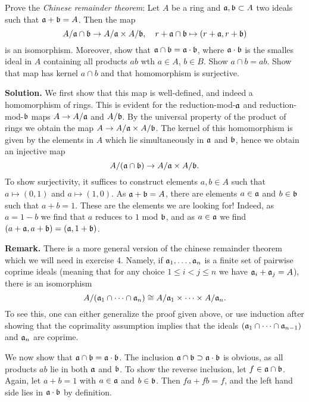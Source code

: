 \documentclass[a4paper,11pt]{article}
\begin{document}
Prove the \textit{Chinese remainder theorem}: Let $A$ be a ring and $\mathfrak{a}, \mathfrak{b}
\subset A$ two ideals such that $\mathfrak{a} + \mathfrak{b} = A$. Then the map 
\begin{equation*}
    A/ \mathfrak{a} \cap \mathfrak{b} \to A/ \mathfrak{a} \times A/\mathfrak{b}, \quad 
    r + \mathfrak{a} \cap \mathfrak{b} \mapsto (r + \mathfrak{a}, r + \mathfrak{b})
\end{equation*}
is an isomorphism. Moreover, show that $\mathfrak{a} \cap \mathfrak{b} = \mathfrak{a} \cdot \mathfrak{b}$, where
$\mathfrak{a} \cdot \mathfrak{b}$ is the smalles ideal in $A$ containing all products $ab$ 
wth $a \in A$, $b \in B$. 
Show $a \cap b = ab$. Show that map has kernel $a \cap b$ and that homomorphism is surjective. 

\textbf{Solution.} We first show that this map is well-defined, and indeed a 
homomorphism of rings. This is evident for the reduction-mod-$\mathfrak{a}$ and 
reduction-mod-$\mathfrak{b}$ maps $A \to A/\mathfrak{a}$ and $A/\mathfrak{b}$. By the universal property of 
the product of rings we obtain the map $A \to A/\mathfrak{a} \times A/\mathfrak{b}$. The kernel
of this homomorphism is given by the elements in $A$ which lie simultaneously in 
$\mathfrak{a}$ and $\mathfrak{b}$, hence we obtain an injective map 
\begin{equation*}
    A/(\mathfrak{a} \cap \mathfrak{b}) \to A/\mathfrak{a} \times A/\mathfrak{b}.
\end{equation*}
To show surjectivity, it suffices to construct elements $a, b \in A$ such that 
$a \mapsto (0,1)$ and $a \mapsto (1,0)$. As $\mathfrak{a} + \mathfrak{b} = A$, there are elements
$a \in \mathfrak{a}$ and $b \in \mathfrak{b}$ such that $a + b = 1$. These are the elements we 
are looking for! Indeed, as $a = 1 - b$ we find that $a$ reduces to $1$ mod $\mathfrak{b}$,
and as $a \in \mathfrak{a}$ we find $(a + \mathfrak{a}, a + \mathfrak{b}) = (\mathfrak{a}, 1 + \mathfrak{b})$. 

\textbf{Remark.} There is a more general version of the chinese remainder theorem
which we will need in exercise 4. Namely, if $\mathfrak{a}_1, \dots, \mathfrak{a}_n$ is a finite
set of pairwise coprime ideals (meaning that for any choice $1 \leq i < j \leq n$
we have $\mathfrak{a}_i + \mathfrak{a}_j = A$), there is an isomorphism
\begin{equation*}
    A/(\mathfrak{a}_1 \cap \dots \cap \mathfrak{a}_n) \cong A/\mathfrak{a}_1 \times \dots \times A/\mathfrak{a}_n.
\end{equation*}
To see this, one can either generalize the proof given above, or use induction
after showing that the coprimality assumption implies that the ideals
$(\mathfrak{a}_1 \cap \dots \cap \mathfrak{a}_{n-1})$ and $\mathfrak{a}_n$ are coprime.

We now show that $\mathfrak{a} \cap \mathfrak{b} = \mathfrak{a} \cdot \mathfrak{b}$. The inclusion 
$\mathfrak{a} \cap \mathfrak{b} \supset \mathfrak{a} \cdot \mathfrak{b}$ is obvious, as all products $ab$ lie in both
$\mathfrak{a}$ and $\mathfrak{b}$. To show the reverse inclusion, let $f \in \mathfrak{a} \cap \mathfrak{b}$. Again,
let $a + b = 1$ with $a \in \mathfrak{a}$ and $b \in \mathfrak{b}$. Then $fa + fb = f$, and the 
left hand side lies in $\mathfrak{a} \cdot \mathfrak{b}$ by definition. 
\end{document}
